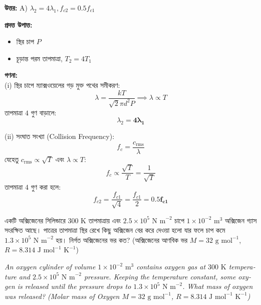 \documentclass[12pt, a4paper]{article}
\begin{document}
\vspace{0.5em}
\begin{tcolorbox}[answerbox]
    \textbf{\color{success} উত্তর:} A) $\lambda_2 = 4 \lambda_1, f_{c2} = 0.5 f_{c1}$
\end{tcolorbox}
\vspace{1em}

\begin{tcolorbox}[solutionbox={সমাধান (Solution)}]
    \noindent
    \textbf{প্রদত্ত উপাত্ত:}
    \begin{itemize}[leftmargin=1.5em, itemsep=0.2em]
        \item স্থির চাপ $P$
        \item চূড়ান্ত পরম তাপমাত্রা, $T_2 = 4 T_1$
    \end{itemize}

    \vspace{0.6em}
    \noindent\textbf{গণনা:} \\
    (i) স্থির চাপে ম্যাক্সওয়েলের গড় মুক্ত পথের সমীকরণ:
    \[ \lambda = \frac{k T}{\sqrt{2} \pi d^2 P} \implies \lambda \propto T \]
    তাপমাত্রা $4$ গুণ বাড়ালে:
    \[ \lambda_2 = \mathbf{4 \lambda_1} \]
    
    (ii) সংঘাত সংখ্যা (Collision Frequency):
    \[ f_c = \frac{c_{\text{rms}}}{\lambda} \]
    যেহেতু $c_{\text{rms}} \propto \sqrt{T}$ এবং $\lambda \propto T$:
    \[ f_c \propto \frac{\sqrt{T}}{T} = \frac{1}{\sqrt{T}} \]
    তাপমাত্রা $4$ গুণ করা হলে:
    \[ f_{c2} = \frac{f_{c1}}{\sqrt{4}} = \frac{f_{c1}}{2} = \mathbf{0.5 f_{c1}} \]
\end{tcolorbox}
\begin{tcolorbox}[questionbox={প্রশ্ন (Question) 8}]
    \noindent
    একটি অক্সিজেনের সিলিন্ডারে $300\text{ K}$ তাপমাত্রায় এবং $2.5 \times 10^5\text{ N m}^{-2}$ চাপে $1 \times 10^{-2}\text{ m}^3$ অক্সিজেন গ্যাস সংরক্ষিত আছে। পাত্রের তাপমাত্রা স্থির রেখে কিছু অক্সিজেন বের করে দেওয়া হলো যার ফলে চাপ কমে $1.3 \times 10^5\text{ N m}^{-2}$ হয়। নির্গত অক্সিজেনের ভর কত? (অক্সিজেনের আণবিক ভর $M = 32\text{ g mol}^{-1}$, $R = 8.314\text{ J mol}^{-1}\text{ K}^{-1}$)
    
    \vspace{0.8em}
    \begin{english}
    \noindent\textit{\color{darkgray}
    An oxygen cylinder of volume $1 \times 10^{-2}\text{ m}^3$ contains oxygen gas at $300\text{ K}$ temperature and $2.5 \times 10^5\text{ N m}^{-2}$ pressure. Keeping the temperature constant, some oxygen is released until the pressure drops to $1.3 \times 10^5\text{ N m}^{-2}$. What mass of oxygen was released? (Molar mass of Oxygen $M = 32\text{ g mol}^{-1}$, $R = 8.314\text{ J mol}^{-1}\text{ K}^{-1}$)
    }
    \end{english}
\end{tcolorbox}
\end{document}
